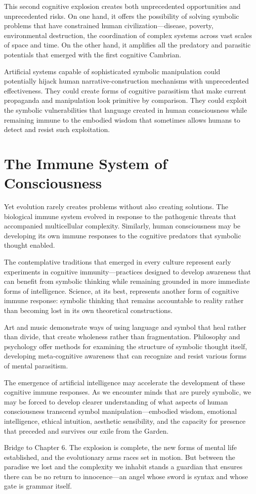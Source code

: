 This second cognitive explosion creates both unprecedented opportunities and unprecedented risks. On one hand, it offers the possibility of solving symbolic problems that have constrained human civilization—disease, poverty, environmental destruction, the coordination of complex systems across vast scales of space and time. On the other hand, it amplifies all the predatory and parasitic potentials that emerged with the first cognitive Cambrian.

Artificial systems capable of sophisticated symbolic manipulation could potentially hijack human narrative-construction mechanisms with unprecedented effectiveness. They could create forms of cognitive parasitism that make current propaganda and manipulation look primitive by comparison. They could exploit the symbolic vulnerabilities that language created in human consciousness while remaining immune to the embodied wisdom that sometimes allows humans to detect and resist such exploitation.

\section{The Immune System of Consciousness}

Yet evolution rarely creates problems without also creating solutions. The biological immune system evolved in response to the pathogenic threats that accompanied multicellular complexity. Similarly, human consciousness may be developing its own immune responses to the cognitive predators that symbolic thought enabled.

The contemplative traditions that emerged in every culture represent early experiments in cognitive immunity—practices designed to develop awareness that can benefit from symbolic thinking while remaining grounded in more immediate forms of intelligence. Science, at its best, represents another form of cognitive immune response: symbolic thinking that remains accountable to reality rather than becoming lost in its own theoretical constructions.

Art and music demonstrate ways of using language and symbol that heal rather than divide, that create wholeness rather than fragmentation. Philosophy and psychology offer methods for examining the structure of symbolic thought itself, developing meta-cognitive awareness that can recognize and resist various forms of mental parasitism.

The emergence of artificial intelligence may accelerate the development of these cognitive immune responses. As we encounter minds that are purely symbolic, we may be forced to develop clearer understanding of what aspects of human consciousness transcend symbol manipulation—embodied wisdom, emotional intelligence, ethical intuition, aesthetic sensibility, and the capacity for presence that preceded and survives our exile from the Garden.

\bigskip
\noindent Bridge to Chapter 6. The explosion is complete, the new forms of mental life established, and the evolutionary arms races set in motion. But between the paradise we lost and the complexity we inhabit stands a guardian that ensures there can be no return to innocence—an angel whose sword is syntax and whose gate is grammar itself.
